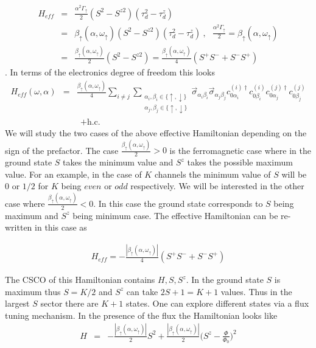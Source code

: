 \documentclass[reprint,prb,superscriptaddress]{revtex4-1}
\begin{document}
\begin{eqnarray}
H_{eff} &=& \frac{\alpha^2 \Gamma_{\uparrow}}{2} (S^2-S^{z2})(\tau^2_{d}-\tau^z_d)  \nonumber\\
&=& \beta_{\uparrow}(\alpha,\omega_{\uparrow})(S^2-S^{z2})(\tau^2_{d}-\tau^z_d)~,~~~\frac{\alpha^2 \Gamma_{\uparrow}}{2} =\beta_{\uparrow}(\alpha,\omega_{\uparrow}) \nonumber\\
&=& \frac{\beta_{\uparrow}(\alpha,\omega_{\uparrow})}{2} (S^2-S^{z2})   =\frac{\beta_{\uparrow}(\alpha,\omega_{\uparrow})}{4} (S^+S^-+S^-S^+)   
\end{eqnarray}
. In terms of the electronics degree of freedom this looks 
\begin{eqnarray}
H_{eff}(\omega,\alpha) &=& \frac{ \beta_{\uparrow}(\alpha,\omega_{\uparrow}) }{4}    \displaystyle\sum_{i\neq j}\displaystyle\sum_{\substack{ \alpha_i,\beta_i\in \{\uparrow,\downarrow\}\\ \alpha_j,\beta_j\in \{\uparrow,\downarrow\}}}\vec{\sigma}_{\alpha_i\beta_i}\vec{\sigma}_{\alpha_j\beta_j}  c_{0\alpha_i}^{(i)\dagger}  c_{0\beta_i}^{(i)}    c_{0\alpha_j}^{(j)\dagger}  c_{0\beta_j}^{(j)}\nonumber\\
&& ~~ +\textrm{h.c.}   
\label{eq:all-to-all_1}
\end{eqnarray}
We will study the two cases of the above effective Hamiltonian depending on the sign of the prefactor. The case $\frac{\beta_{\uparrow}(\alpha,\omega_{\uparrow})}{2} >0$ is the ferromagnetic case where in the ground state $S$ takes the minimum value and $S^z$ takes the possible maximum value. For an example, in the case of $K$ channels the minimum value of $S$ will be $0$ or $1/2$ for $K$ being $even $ or $odd$ respectively.  We will be interested in the other case where $\frac{\beta_{\uparrow}(\alpha,\omega_{\uparrow})}{2} <0$. In this case the ground state corresponds to $S$ being maximum and $S^z$ being minimum case. The effective Hamiltonian can be re-written in this case as

\begin{eqnarray}
H_{eff}   =-\frac{|\beta_{\uparrow}(\alpha,\omega_{\uparrow})|}{4} (S^+S^{-}+ S^-S^{+})    
\end{eqnarray}

\noindent The CSCO of this Hamiltonian contains $H,S,S^z$. In the ground state $S$ is maximum thus $S=K/2$ and $S^z$ can take $2S+1=K+1$ values. Thus in the largest $S$ sector there are $K+1$ states. One can explore different states via a flux tuning mechanism. In the presence of the flux the Hamiltonian looks like
\begin{eqnarray}
H &=& -\frac{|\beta_{\uparrow}(\alpha,\omega_{\uparrow})|}{2} S^2   +\frac{|\beta_{\uparrow}(\alpha,\omega_{\uparrow})|}{2} \bigg(S^{z}-\frac{\Phi}{\Phi_0} \bigg)^2 
\label{eq:flux_spectral}
\end{eqnarray}
\end{document}
